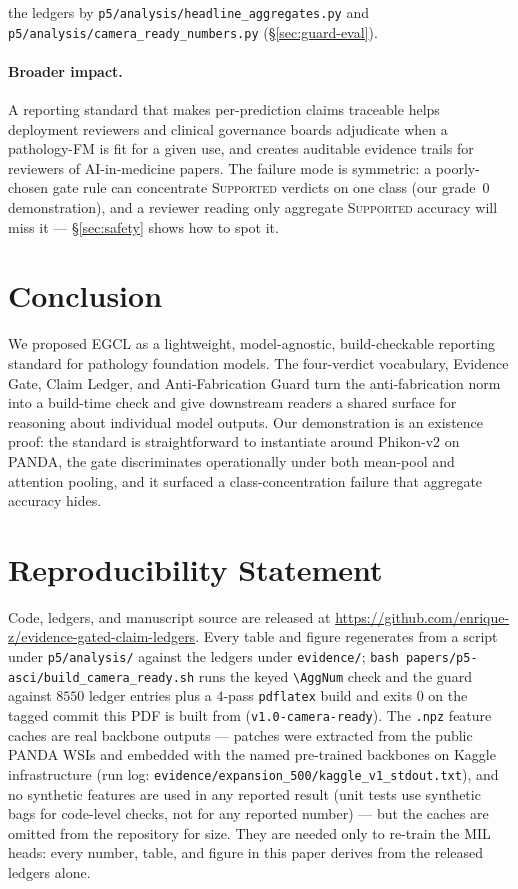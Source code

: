 \documentclass{article}
\newcommand{\SafeNum}[1]{#1}
\begin{document}
the ledgers by \texttt{p5/analysis/headline\_aggregates.py} and \texttt{p5/analysis/camera\_ready\_numbers.py} (\S\ref{sec:guard-eval}).

\paragraph{Broader impact.} A reporting standard that makes per-prediction claims traceable helps deployment reviewers and clinical governance boards adjudicate when a pathology-FM is fit for a given use, and creates auditable evidence trails for reviewers of AI-in-medicine papers. The failure mode is symmetric: a poorly-chosen gate rule can concentrate \textsc{Supported} verdicts on one class (our grade~$\SafeNum{0}$ demonstration), and a reviewer reading only aggregate \textsc{Supported} accuracy will miss it --- \S\ref{sec:safety} shows how to spot it.

\section{Conclusion}
\label{sec:conclusion}

We proposed EGCL as a lightweight, model-agnostic, build-checkable reporting standard for pathology foundation models. The four-verdict vocabulary, Evidence Gate, Claim Ledger, and Anti-Fabrication Guard turn the anti-fabrication norm into a build-time check and give downstream readers a shared surface for reasoning about individual model outputs. Our demonstration is an existence proof: the standard is straightforward to instantiate around Phikon-v2 on PANDA, the gate discriminates operationally under both mean-pool and attention pooling, and it surfaced a class-concentration failure that aggregate accuracy hides.




\section*{Reproducibility Statement}

Code, ledgers, and manuscript source are released at \url{https://github.com/enrique-z/evidence-gated-claim-ledgers}. Every table and figure regenerates from a script under \texttt{p5/analysis/} against the ledgers under \texttt{evidence/}; \texttt{bash papers/p5-asci/build\_camera\_ready.sh} runs the keyed \texttt{\textbackslash AggNum} check and the guard against $\SafeNum{8550}$ ledger entries plus a $\SafeNum{4}$-pass \texttt{pdflatex} build and exits $\SafeNum{0}$ on the tagged commit this PDF is built from (\texttt{v1.0-camera-ready}). The \texttt{.npz} feature caches are real backbone outputs --- patches were extracted from the public PANDA WSIs and embedded with the named pre-trained backbones on Kaggle infrastructure (run log: \texttt{evidence/expansion\_500/kaggle\_v1\_stdout.txt}), and no synthetic features are used in any reported result (unit tests use synthetic bags for code-level checks, not for any reported number) --- but the caches are omitted from the repository for size. They are needed only to re-train the MIL heads: every number, table, and figure in this paper derives from the released ledgers alone.
\end{document}
